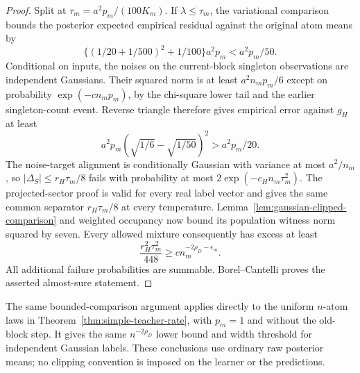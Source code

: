 \begin{proof}
Split at $\tau_m=a^2p_m/(100K_m)$. If $\lambda\le\tau_m$, the variational comparison bounds the posterior expected empirical residual against the original atom means by
\[
 \{(1/20+1/500)^2+1/100\}a^2p_m<a^2p_m/50.
\]
Conditional on inputs, the noises on the current-block singleton observations are independent Gaussians. Their squared norm is at least $a^2n_mp_m/6$ except on probability $\exp(-c n_mp_m)$, by the chi-square lower tail and the earlier singleton-count event. Reverse triangle therefore gives empirical error against $g_H$ at least
\[
 a^2p_m(\sqrt{1/6}-\sqrt{1/50})^2>a^2p_m/20.
\]
The noise-target alignment is conditionally Gaussian with variance at most $a^2/n_m$, so $|\Delta_S|\le r_H\tau_m/8$ fails with probability at most $2\exp(-c_Hn_m\tau_m^2)$. The projected-sector proof is valid for every real label vector and gives the same common separator $r_H\tau_m/8$ at every temperature. Lemma~\ref{lem:gaussian-clipped-comparison} and weighted occupancy now bound its population witness norm squared by seven. Every allowed mixture consequently has excess at least
\[
 \frac{r_H^2\tau_m^2}{448}
 \ge c n_m^{-2\rho_D-\epsilon_m}.
\]
All additional failure probabilities are summable. Borel--Cantelli proves the asserted almost-sure statement.
\end{proof}

The same bounded-comparison argument applies directly to the uniform $n$-atom laws in Theorem~\ref{thm:simple-teacher-rate}, with $p_m=1$ and without the old-block step. It gives the same $n^{-2\rho_D}$ lower bound and width threshold for independent Gaussian labels. These conclusions use ordinary raw posterior means; no clipping convention is imposed on the learner or the predictions.
